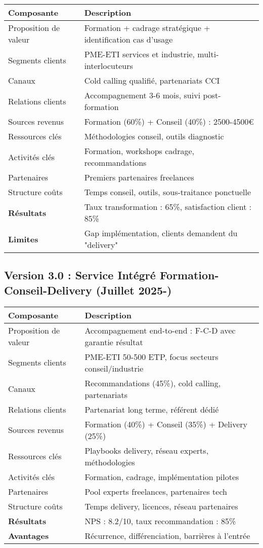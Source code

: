 \begin{longtable}{@{}>{\raggedright\arraybackslash}p{4cm}>{\raggedright\arraybackslash}p{10cm}@{}}
\toprule
\textbf{Composante} & \textbf{Description} \\
\midrule
Proposition de valeur & Formation + cadrage stratégique + identification cas d'usage \\
Segments clients & PME-ETI services et industrie, multi-interlocuteurs \\
Canaux & Cold calling qualifié, partenariats CCI \\
Relations clients & Accompagnement 3-6 mois, suivi post-formation \\
Sources revenus & Formation (60\%) + Conseil (40\%) : 2500-4500€ \\
Ressources clés & Méthodologies conseil, outils diagnostic \\
Activités clés & Formation, workshops cadrage, recommandations \\
Partenaires & Premiers partenaires freelances \\
Structure coûts & Temps conseil, outils, sous-traitance ponctuelle \\
\midrule
\textbf{Résultats} & Taux transformation : 65\%, satisfaction client : 85\% \\
\textbf{Limites} & Gap implémentation, clients demandent du "delivery" \\
\bottomrule
\end{longtable}

\subsection{Version 3.0 : Service Intégré Formation-Conseil-Delivery (Juillet 2025-)}

\begin{longtable}{@{}>{\raggedright\arraybackslash}p{4cm}>{\raggedright\arraybackslash}p{10cm}@{}}
\toprule
\textbf{Composante} & \textbf{Description} \\
\midrule
Proposition de valeur & Accompagnement end-to-end : F-C-D avec garantie résultat \\
Segments clients & PME-ETI 50-500 ETP, focus secteurs conseil/industrie \\
Canaux & Recommandations (45\%), cold calling, partenariats \\
Relations clients & Partenariat long terme, référent dédié \\
Sources revenus & Formation (40\%) + Conseil (35\%) + Delivery (25\%) \\
Ressources clés & Playbooks delivery, réseau experts, méthodologies \\
Activités clés & Formation, cadrage, implémentation pilotes \\
Partenaires & Pool experts freelances, partenaires tech \\
Structure coûts & Temps delivery, licences, réseau partenaires \\
\midrule
\textbf{Résultats} & NPS : 8.2/10, taux recommandation : 85\% \\
\textbf{Avantages} & Récurrence, différenciation, barrières à l'entrée \\
\bottomrule
\end{longtable}


